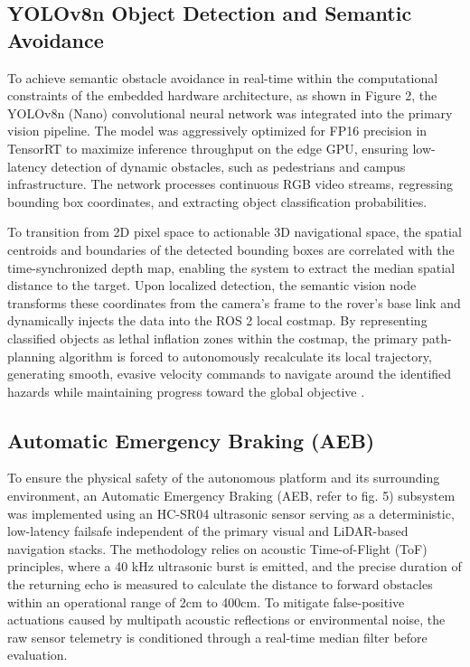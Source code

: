 \documentclass[journal,transmag]{IEEEtran}
\begin{document}
\subsection{YOLOv8n Object Detection and Semantic Avoidance} To achieve semantic obstacle avoidance in real-time within the computational constraints of the embedded hardware architecture, as shown in Figure 2, the YOLOv8n (Nano) convolutional neural network was integrated into the primary vision pipeline. The model was aggressively optimized for FP16 precision in TensorRT to maximize inference throughput on the edge GPU, ensuring low-latency detection of dynamic obstacles, such as pedestrians and campus infrastructure. The network processes continuous RGB video streams, regressing bounding box coordinates, and extracting object classification probabilities. 

To transition from 2D pixel space to actionable 3D navigational space, the spatial centroids and boundaries of the detected bounding boxes are correlated with the time-synchronized depth map, enabling the system to extract the median spatial distance to the target. Upon localized detection, the semantic vision node transforms these coordinates from the camera's frame to the rover's base link and dynamically injects the data into the ROS 2 local costmap. By representing classified objects as lethal inflation zones within the costmap, the primary path-planning algorithm is forced to autonomously recalculate its local trajectory, generating smooth, evasive velocity commands to navigate around the identified hazards while maintaining progress toward the global objective \cite{Fox1997}.

\subsection{Automatic Emergency Braking (AEB)} To ensure the physical safety of the autonomous platform and its surrounding environment, an Automatic Emergency Braking (AEB, refer to fig. 5) subsystem was implemented using an HC-SR04 ultrasonic sensor serving as a deterministic, low-latency failsafe independent of the primary visual and LiDAR-based navigation stacks. The methodology relies on acoustic Time-of-Flight (ToF) principles, where a 40 kHz ultrasonic burst is emitted, and the precise duration of the returning echo is measured to calculate the distance to forward obstacles within an operational range of 2cm to 400cm. To mitigate false-positive actuations caused by multipath acoustic reflections or environmental noise, the raw sensor telemetry is conditioned through a real-time median filter before evaluation. 
\end{document}

